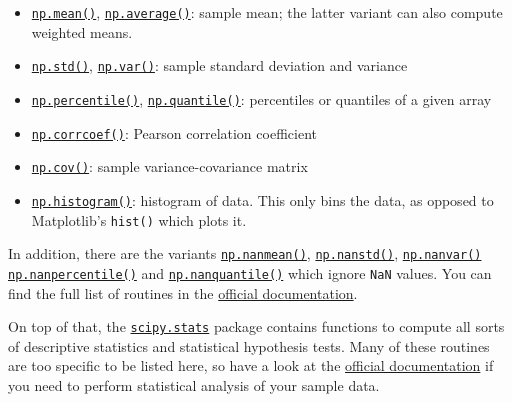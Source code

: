 \documentclass{scrartcl}
\providecommand{\tightlist}{%
      \setlength{\itemsep}{0pt}\setlength{\parskip}{0pt}}
\begin{document}
\begin{itemize}
\tightlist
\item
  \href{https://numpy.org/doc/stable/reference/generated/numpy.mean.html}{\texttt{np.mean()}},
  \href{https://numpy.org/doc/stable/reference/generated/numpy.average.html}{\texttt{np.average()}}:
  sample mean; the latter variant can also compute weighted means.
\item
  \href{https://numpy.org/doc/stable/reference/generated/numpy.std}{\texttt{np.std()}},
  \href{https://numpy.org/doc/stable/reference/generated/numpy.var.html}{\texttt{np.var()}}:
  sample standard deviation and variance
\item
  \href{https://numpy.org/doc/stable/reference/generated/numpy.percentile.html}{\texttt{np.percentile()}},
  \href{https://numpy.org/doc/stable/reference/generated/numpy.quantile.html}{\texttt{np.quantile()}}:
  percentiles or quantiles of a given array
\item
  \href{https://numpy.org/doc/stable/reference/generated/numpy.corrcoef.html}{\texttt{np.corrcoef()}}:
  Pearson correlation coefficient
\item
  \href{https://numpy.org/doc/stable/reference/generated/numpy.cov.html}{\texttt{np.cov()}}:
  sample variance-covariance matrix
\item
  \href{https://numpy.org/doc/stable/reference/generated/numpy.histogram.html}{\texttt{np.histogram()}}:
  histogram of data. This only bins the data, as opposed to Matplotlib's
  \texttt{hist()} which plots it.
\end{itemize}

In addition, there are the variants
\href{https://numpy.org/doc/stable/reference/generated/numpy.nanmean.html}{\texttt{np.nanmean()}},
\href{https://numpy.org/doc/stable/reference/generated/numpy.nanstd.html}{\texttt{np.nanstd()}},
\href{https://numpy.org/doc/stable/reference/generated/numpy.nanvar.html}{\texttt{np.nanvar()}}
\href{https://numpy.org/doc/stable/reference/generated/numpy.nanpercentile.html}{\texttt{np.nanpercentile()}}
and
\href{https://numpy.org/doc/stable/reference/generated/numpy.nanquantile.html}{\texttt{np.nanquantile()}}
which ignore \texttt{NaN} values. You can find the full list of routines
in the
\href{https://numpy.org/doc/stable/reference/routines.statistics.html}{official
documentation}.

On top of that, the
\href{https://docs.scipy.org/doc/scipy/reference/stats.html}{\texttt{scipy.stats}}
package contains functions to compute all sorts of descriptive
statistics and statistical hypothesis tests. Many of these routines are
too specific to be listed here, so have a look at the
\href{https://docs.scipy.org/doc/scipy/reference/stats.html\#summary-statistics}{official
documentation} if you need to perform statistical analysis of your
sample data.
\end{document}
